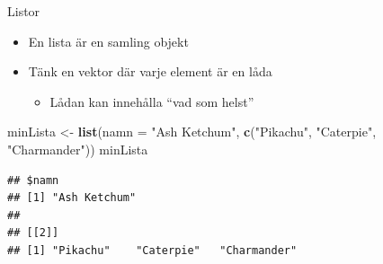 \documentclass[
  11pt,
  ignorenonframetext,
]{beamer}
\newenvironment{Shaded}{\begin{snugshade}}{\end{snugshade}}
\newcommand{\DataTypeTok}[1]{\textcolor[rgb]{0.13,0.29,0.53}{#1}}
\newcommand{\KeywordTok}[1]{\textcolor[rgb]{0.13,0.29,0.53}{\textbf{#1}}}
\newcommand{\NormalTok}[1]{#1}
\newcommand{\StringTok}[1]{\textcolor[rgb]{0.31,0.60,0.02}{#1}}
\providecommand{\tightlist}{%
  \setlength{\itemsep}{0pt}\setlength{\parskip}{0pt}}
\begin{document}
\begin{frame}[fragile]{Listor}
\protect\hypertarget{listor-1}{}
\begin{itemize}
\tightlist
\item
  En lista är en samling objekt
\item
  Tänk en vektor där varje element är en låda

  \begin{itemize}
  \tightlist
  \item
    Lådan kan innehålla ``vad som helst''
  \end{itemize}
\end{itemize}

\begin{Shaded}
\begin{Highlighting}[]
\NormalTok{minLista \textless{}{-}}\StringTok{ }\KeywordTok{list}\NormalTok{(}\DataTypeTok{namn =} \StringTok{"Ash Ketchum"}\NormalTok{,}
             \KeywordTok{c}\NormalTok{(}\StringTok{"Pikachu"}\NormalTok{, }\StringTok{"Caterpie"}\NormalTok{, }\StringTok{"Charmander"}\NormalTok{))}
\NormalTok{minLista}
\end{Highlighting}
\end{Shaded}

\begin{verbatim}
## $namn
## [1] "Ash Ketchum"
## 
## [[2]]
## [1] "Pikachu"    "Caterpie"   "Charmander"
\end{verbatim}
\end{frame}
\end{document}
